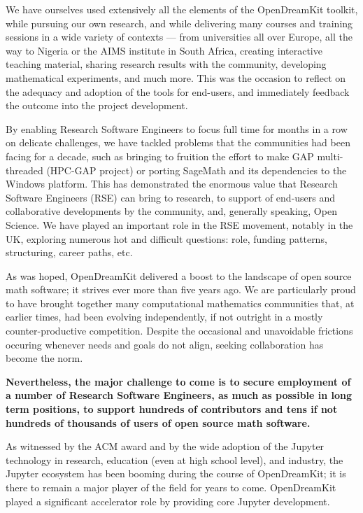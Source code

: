 We have ourselves used extensively all the elements of the OpenDreamKit toolkit, while pursuing our own research, and while delivering many courses and training sessions in a wide variety of contexts --- from universities all over Europe, all the way to Nigeria or the AIMS institute in South Africa, creating interactive teaching material, sharing research results with the community, developing mathematical experiments, and much more.
This was the occasion to reflect on the adequacy and adoption of the tools for end-users, and immediately feedback the outcome into the project development.

By enabling Research Software Engineers to focus full time for months in a row on delicate challenges, we have tackled problems that the communities had been facing for a decade, such as bringing to fruition the effort to make GAP multi-threaded (HPC-GAP project) or porting SageMath and its dependencies to the Windows platform.
This has demonstrated the enormous value that Research Software Engineers (RSE) can bring to research, to support of end-users and collaborative developments by the community, and, generally speaking, Open Science. We have played an important role in the RSE movement, notably in the UK, exploring numerous hot and difficult questions: role, funding patterns, structuring, career paths, etc.

As was hoped, OpenDreamKit delivered a boost to the landscape of open source math software; it strives ever more than five years ago. We are particularly proud to have brought together many computational mathematics communities that, at earlier times, had been evolving independently, if not outright in a mostly counter-productive competition. Despite the occasional and unavoidable frictions occuring whenever needs and goals do not align, seeking collaboration has become the norm. 

\textbf{Nevertheless, the major challenge to come is to secure employment of a number of Research Software Engineers, as much as possible in long term positions, to support hundreds of contributors and tens if not hundreds of thousands of users of open source math software.}


As witnessed by the ACM award and by the wide adoption of the Jupyter technology in research, education (even at high school level), and industry, the Jupyter ecosystem has been booming during the course of OpenDreamKit; it is there to remain a major player of the field for years to come.  OpenDreamKit played a significant accelerator role by providing core Jupyter development.

